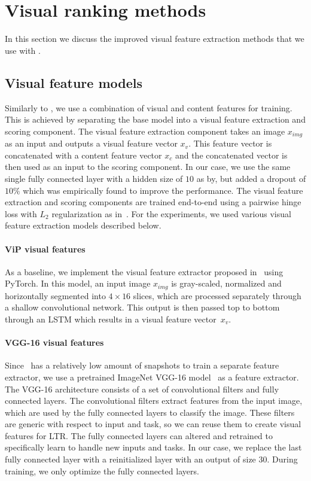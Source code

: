 
\section{Visual ranking methods}
In this section we discuss the improved visual feature extraction methods that we use with \datasetname.

\subsection{Visual feature models}
Similarly to \cite{fan2017learning}, we use a combination of visual and content features for training.
This is achieved by separating the base model into a visual feature extraction and scoring component.
The visual feature extraction component takes an image $x_{img}$ as an input and outputs a visual feature vector $x_{v}$.
This feature vector is concatenated with a content feature vector $x_{c}$ and the concatenated vector is then used as an input to the scoring component.
In our case, we use the same single fully connected layer with a hidden size of $10$ as by\cite{fan2017learning}, but added a dropout of $10\%$ which was empirically found to improve the performance. 
The visual feature extraction and scoring components are trained end-to-end using a pairwise hinge loss with $L_2$ regularization as in~\cite{fan2017learning}.
For the experiments, we used various visual feature extraction models described below.

\paragraph{ViP visual features}
As a baseline, we implement the visual feature extractor proposed in~\citet{fan2017learning} using PyTorch.
In this model, an input image $x_{img}$ is gray-scaled, normalized and horizontally segmented into $4\times16$ slices, which are processed separately through a shallow convolutional network.
This output is then passed top to bottom through an LSTM which results in a visual feature vector~$x_{v}$. 

\paragraph{VGG-16 visual features}
Since \datasetname~has a relatively low amount of snapshots to train a separate feature extractor, we use a pretrained ImageNet VGG-16 model~\cite{simonyan2014very} as a feature extractor. 
The VGG-16 architecture consists of a set of convolutional filters and fully connected layers. The convolutional filters extract features from the input image, which are used by the fully connected layers to classify the image. 
These filters are generic with respect to input and task, so we can reuse them to create visual features for LTR. The fully connected layers can altered and retrained to specifically learn to handle new inputs and tasks. 
In our case, we replace the last fully connected layer with a reinitialized layer with an output of size $30$. During training, we only optimize the fully connected layers.

